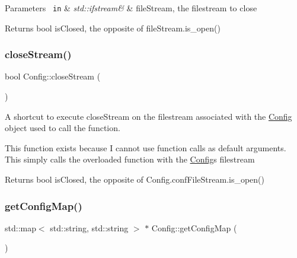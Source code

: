 \begin{DoxyParams}[1]{Parameters}
\mbox{\texttt{ in}}  & {\em std\+::ifstream\&} & file\+Stream, the filestream to close\\
\hline
\end{DoxyParams}
\begin{DoxyReturn}{Returns}
bool is\+Closed, the opposite of file\+Stream.\+is\+\_\+open() 
\end{DoxyReturn}
\mbox{\label{classConfig_a1a6e966edae9532a37f48553e43274f6}} 
\subsubsection{\texorpdfstring{closeStream()}{closeStream()}\hspace{0.1cm}{\footnotesize\ttfamily [2/2]}}
{\footnotesize\ttfamily bool Config\+::close\+Stream (\begin{DoxyParamCaption}{ }\end{DoxyParamCaption})}



A shortcut to execute close\+Stream on the filestream associated with the \mbox{\hyperlink{classConfig}{Config}} object used to call the function. 

This function exists because I cannot use function calls as default arguments. This simply calls the overloaded function with the \mbox{\hyperlink{classConfig}{Config}}\textquotesingle{}s filestream

\begin{DoxyReturn}{Returns}
bool is\+Closed, the opposite of Config.\+conf\+File\+Stream.\+is\+\_\+open() 
\end{DoxyReturn}
\mbox{\label{classConfig_a129cacb3da610950c78f990a19d7e922}} 
\subsubsection{\texorpdfstring{getConfigMap()}{getConfigMap()}}
{\footnotesize\ttfamily std\+::map$<$ std\+::string, std\+::string $>$ $\ast$ Config\+::get\+Config\+Map (\begin{DoxyParamCaption}{ }\end{DoxyParamCaption})\hspace{0.3cm}{\ttfamily [virtual]}}



